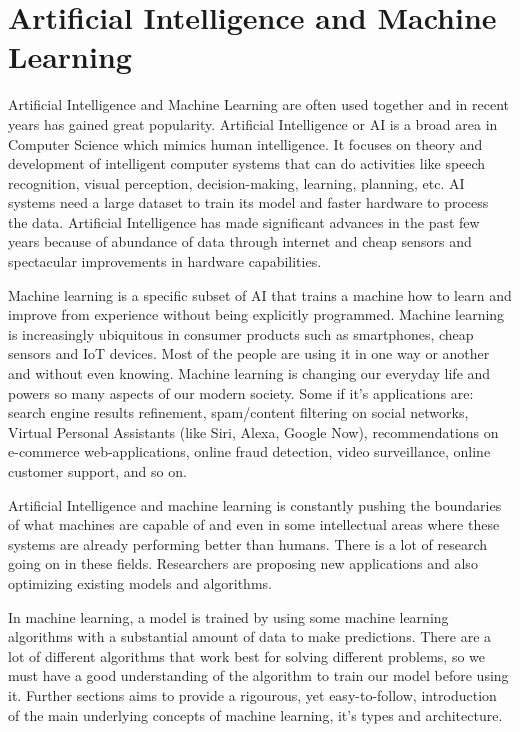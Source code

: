 \section{Artificial Intelligence and Machine Learning}
Artificial Intelligence and Machine Learning are often used together and in recent years has gained great popularity. Artificial Intelligence or AI is a broad area in Computer Science which mimics human intelligence. It focuses on theory and development of intelligent computer systems that can do activities like speech recognition, visual perception, decision-making, learning, planning, etc. AI systems need a large dataset to train its model and faster hardware to process the data. Artificial Intelligence has made significant advances in the past few years because of abundance of data through internet and cheap sensors and spectacular improvements in hardware capabilities.
\par
Machine learning is a specific subset of AI that trains a machine how to learn and improve from experience without being explicitly programmed. Machine learning is increasingly ubiquitous in consumer products such as smartphones, cheap sensors and IoT devices. Most of the people are using it in one way or another and without even knowing. Machine learning is changing our everyday life and powers so many aspects of our modern society. Some if it's applications are: search engine results refinement, spam/content filtering on social networks, Virtual Personal Assistants (like Siri, Alexa, Google Now), recommendations on e-commerce web-applications, online fraud detection, video surveillance, online customer support, and so on.

\par
Artificial Intelligence and machine learning is constantly pushing the boundaries of what machines are capable of and even in some intellectual areas where these systems are already performing better than humans. There is a lot of research going on in these fields. Researchers are proposing new applications and also optimizing existing models and algorithms.

\par
In machine learning, a model is trained by using some machine learning algorithms with a substantial amount of data to make predictions. There are a lot of different algorithms that work best for solving different problems, so we must have a good understanding of the algorithm to train our model before using it. Further sections aims to provide a rigourous, yet easy-to-follow, introduction of the main underlying concepts of machine learning, it's types and architecture.

